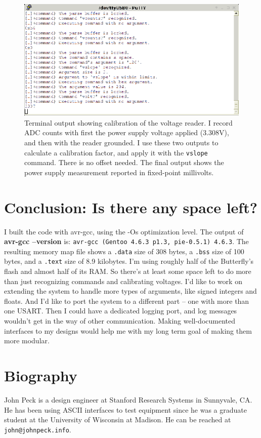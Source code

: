\begin{figure}[ht]
    \begin{center}
        \includegraphics[clip,scale=1.5]{pngs/caltrace.eps}
        \caption{Terminal output showing calibration of the voltage reader.  I record ADC counts with first the power supply voltage applied (3.308V), and then with the reader grounded.  I use these two outputs to calculate a calibration factor, and apply it with the \texttt{vslope} command.  There is no offset needed.  The final output shows the power supply measurement reported in fixed-point millivolts.\label{fig:caltrace}}
    \end{center}
\end{figure}


\clearpage{}
\section{Conclusion: Is there any space left?}
I built the code with avr-gcc, using the -Os optimization level.  The output of \textbf{avr-gcc --version} is: \texttt{avr-gcc (Gentoo 4.6.3 p1.3, pie-0.5.1) 4.6.3}. The resulting memory map file shows a \texttt{.data} size of 308 bytes, a \texttt{.bss} size of 100 bytes, and a \texttt{.text} size of 8.9 kilobytes.  I'm using roughly half of the Butterfly's flash and almost half of its RAM.  So there's at least some space left to do more than just recognizing commands and calibrating voltages.  I'd like to work on extending the system to handle more types of arguments, like signed integers and floats.  And I'd like to port the system to a different part -- one with more than one USART.  Then I could have a dedicated logging port, and log messages wouldn't get in the way of other communication.  Making well-documented interfaces to my designs would help me with my long term goal of making them more modular.

\section{Biography}
John Peck is a design engineer at Stanford Research Systems in Sunnyvale, CA.  He has been using ASCII interfaces to test equipment since he was a graduate student at the University of Wisconsin at Madison.  He can be reached at \texttt{john@johnpeck.info}.


\clearpage{}
\raggedright


